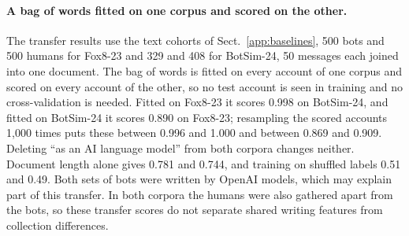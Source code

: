 \documentclass[10pt,a4paper]{article}
\begin{document}
\paragraph{A bag of words fitted on one corpus and scored on the other.}
The transfer results use the text cohorts of Sect.~\ref{app:baselines}, 500 bots and 500 humans for
  Fox8-23 and 329 and 408 for BotSim-24, 50 messages each joined into one document.
The bag of words is fitted on every account of one corpus and scored on every account of the other,
  so no test account is seen in training and no cross-validation is needed.
Fitted on Fox8-23 it scores 0.998 on BotSim-24, and fitted on BotSim-24 it scores 0.890 on Fox8-23;
  resampling the scored accounts 1,000 times puts these between 0.996 and 1.000 and between 0.869
  and 0.909.
Deleting ``as an AI language model'' from both corpora changes neither.
Document length alone gives 0.781 and 0.744, and training on shuffled labels 0.51 and 0.49.
Both sets of bots were written by OpenAI models, which may explain part of this transfer.
In both corpora the humans were also gathered apart from the bots, so these transfer scores do not
  separate shared writing features from collection differences.
\end{document}
